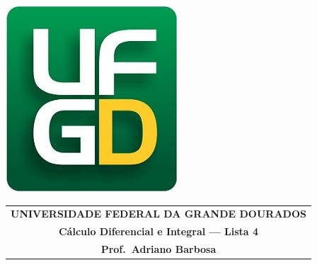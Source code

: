\documentclass[a4paper,5pt]{amsbook}
\begin{document}
\thispagestyle{empty}
\pagestyle{empty}
\begin{minipage}[h]{0.14\textwidth}
	\includegraphics[scale=0.24]{../ufgd.png}
\end{minipage}
\begin{minipage}[h]{\textwidth}
\begin{tabular}{c}
{{\bf UNIVERSIDADE FEDERAL DA GRANDE DOURADOS}}\\
{{\bf C\'alculo Diferencial e Integral --- Lista 4}}\\
{{\bf Prof.\ Adriano Barbosa}}\\
\end{tabular}
\vspace{-0.45cm}
%
\end{minipage}

\end{document}
